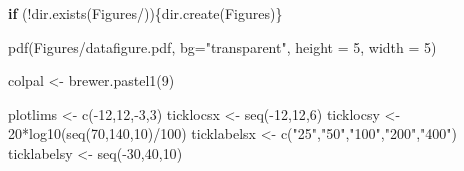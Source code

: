 \documentclass[
]{article}
\newenvironment{Shaded}{\begin{snugshade}}{\end{snugshade}}
\newcommand{\AttributeTok}[1]{\textcolor[rgb]{0.77,0.63,0.00}{#1}}
\newcommand{\ControlFlowTok}[1]{\textcolor[rgb]{0.13,0.29,0.53}{\textbf{#1}}}
\newcommand{\DecValTok}[1]{\textcolor[rgb]{0.00,0.00,0.81}{#1}}
\newcommand{\FunctionTok}[1]{\textcolor[rgb]{0.00,0.00,0.00}{#1}}
\newcommand{\NormalTok}[1]{#1}
\newcommand{\OtherTok}[1]{\textcolor[rgb]{0.56,0.35,0.01}{#1}}
\newcommand{\SpecialCharTok}[1]{\textcolor[rgb]{0.00,0.00,0.00}{#1}}
\newcommand{\StringTok}[1]{\textcolor[rgb]{0.31,0.60,0.02}{#1}}
\begin{document}
\begin{Shaded}
\begin{Highlighting}[]
\ControlFlowTok{if}\NormalTok{ (}\SpecialCharTok{!}\FunctionTok{dir.exists}\NormalTok{(}\StringTok{\textquotesingle{}Figures/\textquotesingle{}}\NormalTok{))\{}\FunctionTok{dir.create}\NormalTok{(}\StringTok{\textquotesingle{}Figures\textquotesingle{}}\NormalTok{)\}}

\FunctionTok{pdf}\NormalTok{(}\StringTok{\textquotesingle{}Figures/datafigure.pdf\textquotesingle{}}\NormalTok{, }\AttributeTok{bg=}\StringTok{"transparent"}\NormalTok{, }\AttributeTok{height =} \DecValTok{5}\NormalTok{, }\AttributeTok{width =} \DecValTok{5}\NormalTok{)}

\NormalTok{colpal }\OtherTok{\textless{}{-}} \FunctionTok{brewer.pastel1}\NormalTok{(}\DecValTok{9}\NormalTok{)}

\NormalTok{plotlims }\OtherTok{\textless{}{-}} \FunctionTok{c}\NormalTok{(}\SpecialCharTok{{-}}\DecValTok{12}\NormalTok{,}\DecValTok{12}\NormalTok{,}\SpecialCharTok{{-}}\DecValTok{3}\NormalTok{,}\DecValTok{3}\NormalTok{) }
\NormalTok{ticklocsx }\OtherTok{\textless{}{-}} \FunctionTok{seq}\NormalTok{(}\SpecialCharTok{{-}}\DecValTok{12}\NormalTok{,}\DecValTok{12}\NormalTok{,}\DecValTok{6}\NormalTok{)   }
\NormalTok{ticklocsy }\OtherTok{\textless{}{-}} \DecValTok{20}\SpecialCharTok{*}\FunctionTok{log10}\NormalTok{(}\FunctionTok{seq}\NormalTok{(}\DecValTok{70}\NormalTok{,}\DecValTok{140}\NormalTok{,}\DecValTok{10}\NormalTok{)}\SpecialCharTok{/}\DecValTok{100}\NormalTok{)   }
\NormalTok{ticklabelsx }\OtherTok{\textless{}{-}} \FunctionTok{c}\NormalTok{(}\StringTok{"25"}\NormalTok{,}\StringTok{"50"}\NormalTok{,}\StringTok{"100"}\NormalTok{,}\StringTok{"200"}\NormalTok{,}\StringTok{"400"}\NormalTok{)      }
\NormalTok{ticklabelsy }\OtherTok{\textless{}{-}} \FunctionTok{seq}\NormalTok{(}\SpecialCharTok{{-}}\DecValTok{30}\NormalTok{,}\DecValTok{40}\NormalTok{,}\DecValTok{10}\NormalTok{)   }


\end{Highlighting}
\end{Shaded}
\end{document}
